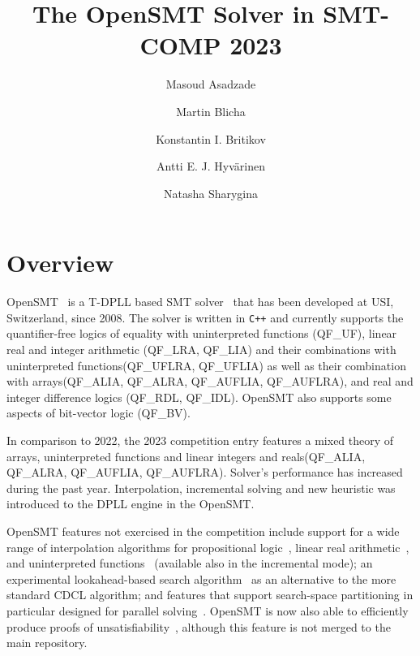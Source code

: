 \documentclass{easychair}
\title{The OpenSMT Solver in SMT-COMP 2023}
\author{
Masoud Asadzade \and
Martin Blicha \and
Konstantin I. Britikov \and
Antti E. J. Hyv{\"a}rinen \and
Natasha Sharygina \\
}
\institute{Universit{\`a} della Svizzera italiana (USI), Lugano,
Switzerland}
\date{}
\newcommand{\qflra}{QF\_LRA}
\newcommand{\qflia}{QF\_LIA}
\newcommand{\qfuf}{QF\_UF}
\newcommand{\qfbv}{QF\_BV}
\newcommand{\qfrdl}{QF\_RDL}
\newcommand{\qfidl}{QF\_IDL}
\newcommand{\qfuflra}{QF\_UFLRA}
\newcommand{\qfuflia}{QF\_UFLIA}
\newcommand{\qfauflia}{QF\_AUFLIA}
\newcommand{\qfauflra}{QF\_AUFLRA}
\newcommand{\qfalia}{QF\_ALIA}
\newcommand{\qfalra}{QF\_ALRA}
\begin{document}
\maketitle

\section{Overview}

OpenSMT~\cite{HyvarinenMAS16} is a T-DPLL based SMT
solver~\cite{NieuwenhuisOT:JACM06} that has been developed at USI,
Switzerland, since 2008.  The solver is written in {\tt C++} and
currently supports the quantifier-free logics of equality with
uninterpreted functions (\qfuf), linear real and integer arithmetic
(\qflra, \qflia) and their combinations with uninterpreted functions(\qfuflra, \qfuflia) as well as their combination with arrays(\qfalia, \qfalra, \qfauflia, \qfauflra), and real and integer difference logics (\qfrdl,
\qfidl).  OpenSMT also supports some aspects of bit-vector logic
(\qfbv).

In comparison to 2022, the 2023 competition entry features a 
mixed theory of arrays, uninterpreted functions and linear integers and reals(\qfalia, \qfalra, \qfauflia, \qfauflra). Solver's performance has increased during the past year. Interpolation, incremental solving and new heuristic was introduced to the DPLL engine in the OpenSMT.

OpenSMT features not exercised in the competition include support for a
wide range of interpolation algorithms for propositional
logic~\cite{AltFHS:VSTTE2015}, linear real
arithmetic~\cite{BlichaHKS19}, and uninterpreted
functions~\cite{AltHAS:FMCAD17} (available also in the incremental
mode); an experimental look\-ahead-based search
algorithm~\cite{HyvarinenMSCS18} as an alternative to the more standard
CDCL algorithm; and features that support search-space partitioning in
particular designed for parallel solving~\cite{HyvarinenMS:SAT15}.
OpenSMT is now also able to efficiently produce proofs of
unsatisfiability~\cite{OtoniBEHS:DAC21}, although this feature is not merged to the main repository.
\end{document}
